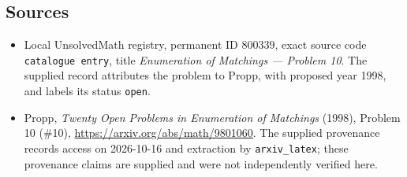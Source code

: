 \documentclass[11pt]{article}
\begin{document}
\subsection{Sources}
\begin{itemize}
\item Local UnsolvedMath registry, permanent ID \(800339\), exact source code \texttt{catalogue entry}, title \emph{Enumeration of Matchings --- Problem 10}. The supplied record attributes the problem to Propp, with proposed year 1998, and labels its status \texttt{open}.
\item Propp, \emph{Twenty Open Problems in Enumeration of Matchings} (1998), Problem 10 (\#10), \url{https://arxiv.org/abs/math/9801060}. The supplied provenance records access on 2026-10-16 and extraction by \texttt{arxiv\_latex}; these provenance claims are supplied and were not independently verified here.
\end{itemize}
\end{document}
